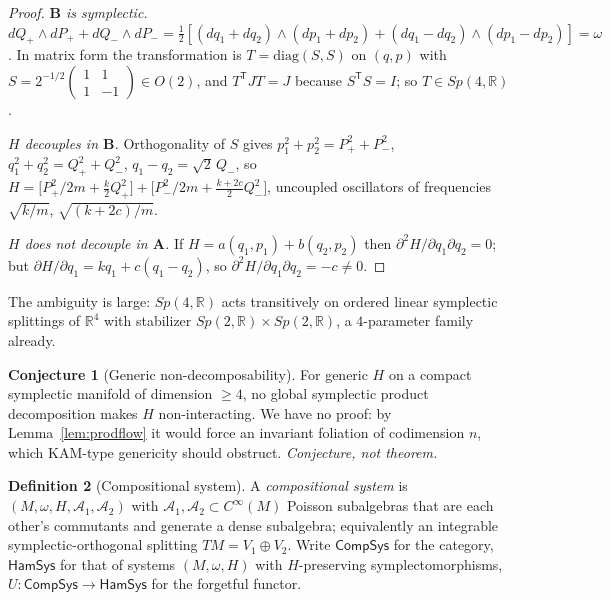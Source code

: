 \documentclass[12pt,a4paper]{article}
\theoremstyle{definition}
\newtheorem{definition}{Definition}[section]
\newtheorem{conjecture}[definition]{Conjecture}
\theoremstyle{plain}
\theoremstyle{commentary}
\newcommand{\R}{\mathbb{R}}
\newcommand{\Cinf}{C^{\infty}}
\newcommand{\CompSys}{\mathsf{CompSys}}
\newcommand{\HamSys}{\mathsf{HamSys}}
\newcommand{\Ac}{\mathcal{A}}
\newcommand{\Sp}{\mathit{Sp}}
\begin{document}
\begin{proof}
\emph{$\textbf{B}$ is symplectic.} $dQ_+\wedge dP_+ + dQ_-\wedge dP_-
=\tfrac12[(dq_1+dq_2)\wedge(dp_1+dp_2)+(dq_1-dq_2)\wedge(dp_1-dp_2)]=\omega$. In matrix form
the transformation is $T=\mathrm{diag}(S,S)$ on $(q,p)$ with
$S=2^{-1/2}\left(\begin{smallmatrix}1&1\\1&-1\end{smallmatrix}\right)\in O(2)$, and
$T^{\mathsf T}JT=J$ because $S^{\mathsf T}S=I$; so $T\in \Sp(4,\R)$.

\emph{$H$ decouples in $\textbf{B}$.} Orthogonality of $S$ gives
$p_1^{2}+p_2^{2}=P_+^{2}+P_-^{2}$, $q_1^{2}+q_2^{2}=Q_+^{2}+Q_-^{2}$, $q_1-q_2=\sqrt2\,Q_-$,
so $H=\bigl[P_+^{2}/2m+\tfrac{k}{2}Q_+^{2}\bigr]+\bigl[P_-^{2}/2m+\tfrac{k+2c}{2}Q_-^{2}
\bigr]$, uncoupled oscillators of frequencies $\sqrt{k/m}$, $\sqrt{(k+2c)/m}$.

\emph{$H$ does not decouple in $\textbf{A}$.} If $H=a(q_1,p_1)+b(q_2,p_2)$ then
$\partial^{2}H/\partial q_1\partial q_2=0$; but $\partial H/\partial q_1=kq_1+c(q_1-q_2)$, so
$\partial^{2}H/\partial q_1\partial q_2=-c\neq0$.
\end{proof}

The ambiguity is large: $\Sp(4,\R)$ acts transitively on ordered linear symplectic splittings
of $\R^{4}$ with stabilizer $\Sp(2,\R)\times\Sp(2,\R)$, a $4$-parameter family already.

\begin{conjecture}[Generic non-decomposability]\label{conj:generic}
For generic $H$ on a compact symplectic manifold of dimension $\ge4$, no global symplectic
product decomposition makes $H$ non-interacting. We have no proof: by
Lemma~\ref{lem:prodflow} it would force an invariant foliation of codimension $n$, which
KAM-type genericity should obstruct. \emph{Conjecture, not theorem.}
\end{conjecture}

\begin{definition}[Compositional system]\label{def:compsys}
A \emph{compositional system} is $(M,\omega,H,\Ac_1,\Ac_2)$ with $\Ac_1,\Ac_2\subset\Cinf(M)$
Poisson subalgebras that are each other's commutants and generate a dense subalgebra;
equivalently an integrable symplectic-orthogonal splitting $TM=V_1\oplus V_2$. Write
$\CompSys$ for the category, $\HamSys$ for that of systems $(M,\omega,H)$ with $H$-preserving
symplectomorphisms, $U:\CompSys\to\HamSys$ for the forgetful functor.
\end{definition}
\end{document}
